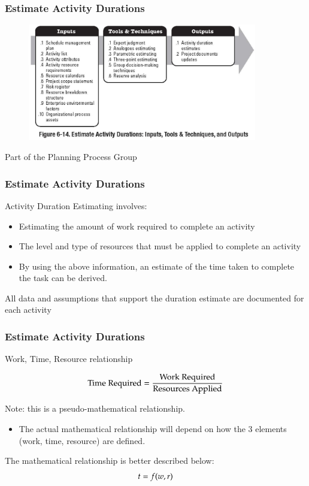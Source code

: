\begin{frame}
\frametitle{Estimate Activity Durations}
\begin{figure}
	\centering
		\includegraphics[width = 10cm]{images/Fig6-14.jpg}
	\label{fig:6-14}
\end{figure}
Part of the Planning Process Group
\end{frame}




\begin{frame}
\frametitle{Estimate Activity Durations}
Activity Duration Estimating involves:
\begin{itemize}
	\item Estimating the amount of work required to complete an activity
	\item The level and type of resources that must be applied to complete an activity
	\item By using the above information, an estimate of the time taken to complete the task can be derived.
\end{itemize}
All data and assumptions that support the duration estimate are documented for each activity
\end{frame}




\begin{frame}
\frametitle{Estimate Activity Durations}
Work, Time, Resource relationship



\begin{equation}
\mbox{Time Required} = \frac{\mbox{Work Required}}{\mbox{Resources Applied}}   \notag
\end{equation}


Note: this is a pseudo-mathematical relationship.
\begin{itemize}
	\item The actual mathematical relationship will depend on how the 3 elements (work, time, resource) are defined.
\end{itemize}
The mathematical relationship is better described below: 
\begin{equation}
t=f(w,r)  \notag
\end{equation} 
\end{frame}





